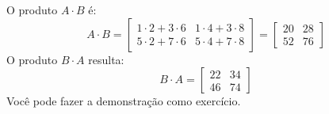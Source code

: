 O produto $A \cdot B$ é:
\begin{displaymath}
A\cdot B=
\begin{bmatrix}
  1 \cdot 2+3 \cdot 6 & 1 \cdot 4+3 \cdot 8 \\
  5 \cdot 2+7 \cdot 6 & 5 \cdot 4+7 \cdot 8
\end{bmatrix}
=
\begin{bmatrix}
  20 & 28\\
  52 & 76
\end{bmatrix}
\end{displaymath}
O produto $B\cdot A$ resulta:
\begin{displaymath}
  B\cdot A=
  \begin{bmatrix}
    22 & 34\\46 & 74
  \end{bmatrix}
\end{displaymath}
Você pode fazer a demonstração como exercício.
